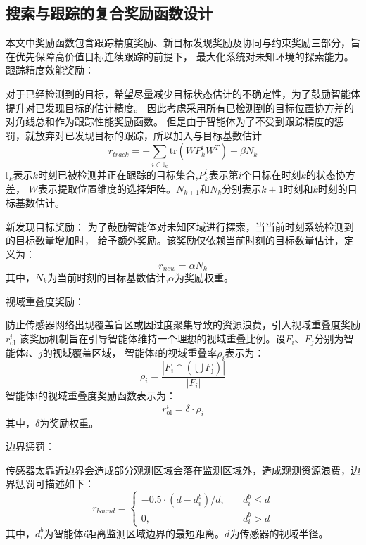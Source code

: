 \subsection{搜索与跟踪的复合奖励函数设计}
本文中奖励函数包含跟踪精度奖励、新目标发现奖励及协同与约束奖励三部分，旨在优先保障高价值目标连续跟踪的前提下，
最大化系统对未知环境的探索能力。
跟踪精度效能奖励：

对于已经检测到的目标，希望尽量减少目标状态估计的不确定性，为了鼓励智能体提升对已发现目标的估计精度。
因此考虑采用所有已检测到的目标位置协方差的对角线总和作为跟踪性能奖励函数。
但是由于智能体为了不受到跟踪精度的惩罚，就放弃对已发现目标的跟踪，所以加入与目标基数估计
\begin{equation}
r_{track}=-\sum_{i\in\mathbb{I}_k}\mathrm{tr}\left(WP_k^iW^T\right)+\beta N_k
\end{equation}
$\mathbb{I}_k$表示$k$时刻已被检测并正在跟踪的目标集合,$P_k^i$表示第$i$个目标在时刻$k$的状态协方差，
$W$表示提取位置维度的选择矩阵。$N_{k+1}$和$N_k$分别表示$k+1$时刻和$k$时刻的目标基数估计。

新发现目标奖励：
为了鼓励智能体对未知区域进行探索，当当前时刻系统检测到的目标数量增加时，
给予额外奖励。该奖励仅依赖当前时刻的目标数量估计，定义为：
\begin{equation}
r_{new}=\alpha N_k
\end{equation}
其中，$N_k$为当前时刻的目标基数估计,$\alpha$为奖励权重。

视域重叠度奖励：

防止传感器网络出现覆盖盲区或因过度聚集导致的资源浪费，引入视域重叠度奖励$r_{\mathrm{ol}}^{i}$
该奖励机制旨在引导智能体维持一个理想的视域重叠比例。设$F_i$、$F_j$分别为智能体$i$、$j$的视域覆盖区域，
智能体$i$的视域重叠率$\rho_i$表示为：
\begin{equation}
\rho_i=\frac{\left|F_i\cap\left(\bigcup F_{\mathrm{j}}\right)\right|}{\left|F_i\right|}
\end{equation}
智能体i的视域重叠度奖励函数表示为：
\begin{equation}
r_{\mathrm{ol}}^i=\delta \cdot \rho_i
\end{equation}
其中，$\delta$为奖励权重。

边界惩罚：

传感器太靠近边界会造成部分观测区域会落在监测区域外，造成观测资源浪费，边界惩罚可描述如下：
\begin{equation}
r_{bound}=\begin{cases}-0.5\cdot(d-d_{i}^{b})/d,&\quad d_{i}^{b}\leq d \\ 0,&\quad d_{i}^{b}>d\end{cases}
\end{equation}
其中，$d_{i}^{b}$为智能体$i$距离监测区域边界的最短距离。$d$为传感器的视域半径。

